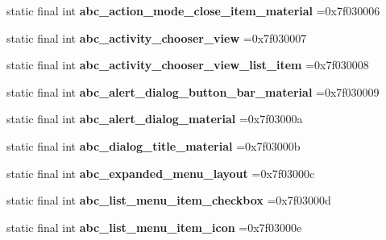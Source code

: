 \begin{DoxyCompactItemize}
static final int {\bfseries abc\+\_\+action\+\_\+mode\+\_\+close\+\_\+item\+\_\+material} =0x7f030006
\item 
\mbox{\label{classproject4_1_1xaria_1_1R_1_1layout_a3eb03d639b8336789f4ccf0dc12ee757}} 
static final int {\bfseries abc\+\_\+activity\+\_\+chooser\+\_\+view} =0x7f030007
\item 
\mbox{\label{classproject4_1_1xaria_1_1R_1_1layout_a3b1a64efb86c5941003212652740ec65}} 
static final int {\bfseries abc\+\_\+activity\+\_\+chooser\+\_\+view\+\_\+list\+\_\+item} =0x7f030008
\item 
\mbox{\label{classproject4_1_1xaria_1_1R_1_1layout_a253c0ef2a4f9b2e89baedf90b9914917}} 
static final int {\bfseries abc\+\_\+alert\+\_\+dialog\+\_\+button\+\_\+bar\+\_\+material} =0x7f030009
\item 
\mbox{\label{classproject4_1_1xaria_1_1R_1_1layout_a7d96317b8fe99ee7f86dfcdc800ef2a7}} 
static final int {\bfseries abc\+\_\+alert\+\_\+dialog\+\_\+material} =0x7f03000a
\item 
\mbox{\label{classproject4_1_1xaria_1_1R_1_1layout_ae654afaa70caae907706712c22a3744b}} 
static final int {\bfseries abc\+\_\+dialog\+\_\+title\+\_\+material} =0x7f03000b
\item 
\mbox{\label{classproject4_1_1xaria_1_1R_1_1layout_a16fdb5fdbce0f824e6444f94ac1a48d2}} 
static final int {\bfseries abc\+\_\+expanded\+\_\+menu\+\_\+layout} =0x7f03000c
\item 
\mbox{\label{classproject4_1_1xaria_1_1R_1_1layout_a89951666cd3527c1577cfc087f69ee28}} 
static final int {\bfseries abc\+\_\+list\+\_\+menu\+\_\+item\+\_\+checkbox} =0x7f03000d
\item 
\mbox{\label{classproject4_1_1xaria_1_1R_1_1layout_ad1a124644679cd761bb1954d0bc6694b}} 
static final int {\bfseries abc\+\_\+list\+\_\+menu\+\_\+item\+\_\+icon} =0x7f03000e
\item 

\end{DoxyCompactItemize}
